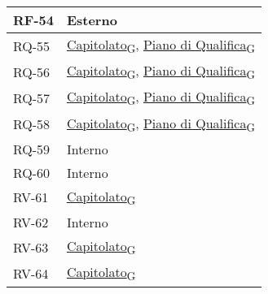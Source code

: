 \begin{longtable}{|>{\centering\arraybackslash}m{}|>{\centering\arraybackslash}m{}|}
	RF-54           & Esterno                                                                                                           \\\hline
	RQ-55           & \href{https://7last.github.io/docs/pb/documentazione-interna/glossario\#capitolato}{Capitolato\textsubscript{G}}, \href{https://7last.github.io/docs/pb/documentazione-interna/glossario\#piano-di-qualifica}{Piano di Qualifica\textsubscript{G}} \\\hline
	RQ-56           & \href{https://7last.github.io/docs/pb/documentazione-interna/glossario\#capitolato}{Capitolato\textsubscript{G}}, \href{https://7last.github.io/docs/pb/documentazione-interna/glossario\#piano-di-qualifica}{Piano di Qualifica\textsubscript{G}} \\\hline
	RQ-57           & \href{https://7last.github.io/docs/pb/documentazione-interna/glossario\#capitolato}{Capitolato\textsubscript{G}}, \href{https://7last.github.io/docs/pb/documentazione-interna/glossario\#piano-di-qualifica}{Piano di Qualifica\textsubscript{G}} \\\hline
	RQ-58           & \href{https://7last.github.io/docs/pb/documentazione-interna/glossario\#capitolato}{Capitolato\textsubscript{G}}, \href{https://7last.github.io/docs/pb/documentazione-interna/glossario\#piano-di-qualifica}{Piano di Qualifica\textsubscript{G}} \\\hline
	RQ-59           & Interno                                                                                                                                                                                                                                              \\\hline
	RQ-60           & Interno                                                                                                                                                                                                                                              \\\hline
	RV-61           & \href{https://7last.github.io/docs/pb/documentazione-interna/glossario\#capitolato}{Capitolato\textsubscript{G}} \\\hline
	RV-62           & Interno                                                                                                           \\\hline
	RV-63           & \href{https://7last.github.io/docs/pb/documentazione-interna/glossario\#capitolato}{Capitolato\textsubscript{G}} \\\hline
	RV-64           & \href{https://7last.github.io/docs/pb/documentazione-interna/glossario\#capitolato}{Capitolato\textsubscript{G}} \\\hline

\end{longtable}
